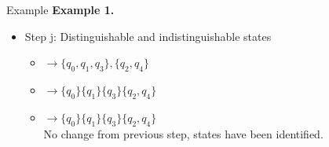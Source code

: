 \documentclass[10pt]{beamer}
\begin{document}
\begin{frame}[t]{Example}
    \textbf{Example 1.}
    \begin{itemize}
        \item Step j: Distinguishable and indistinguishable states
              \begin{itemize}
                  \item $\rightarrow \{q_0, q_1, q_3\}, \{q_2, q_4\}$
                  \item $\rightarrow \{q_0\} \{q_1\} \{q_3\} \{q_2, q_4\}$
                  \item $\rightarrow \{q_0\} \{q_1\} \{q_3\} \{q_2, q_4\}$\\
                        No change from previous step, states have been identified.
              \end{itemize}
    \end{itemize}


\end{frame}
\end{document}
